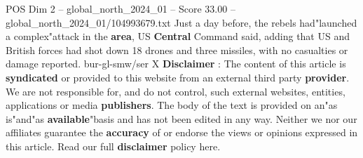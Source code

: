\begin{textsample}{POS Dim 2 – global\_north\_2024\_01 – Score 33.00 – global\_north\_2024\_01/104993679.txt}
Just a day before, the rebels had"launched a complex"attack in the \textbf{area}, US \textbf{Central} Command said, adding that US and British forces had shot down 18 drones and three missiles, with no casualties or damage reported. bur-gl-smw/ser X \textbf{Disclaimer} : The content of this article is \textbf{syndicated} or provided to this website from an external third party \textbf{provider}.
We are not responsible for, and do not control, such external websites, entities, applications or media \textbf{publishers}.
The body of the text is provided on an"as is"and"as \textbf{available}"basis and has not been edited in any way.
Neither we nor our affiliates guarantee the \textbf{accuracy} of or endorse the views or opinions expressed in this article.
Read our full \textbf{disclaimer} policy here.

\end{textsample}
